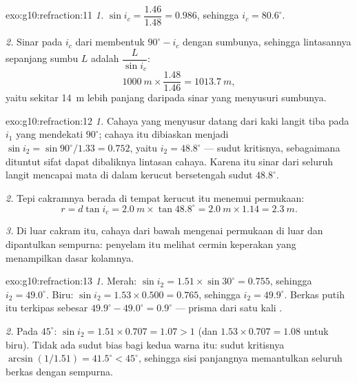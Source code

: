 \begin{solution}{exo:g10:refraction:11}
\emph{1.} $\sin i_c = \dfrac{1.46}{1.48} = 0.986$, sehingga
$i_c = 80.6^\circ$.

\emph{2.} Sinar pada $i_c$ dari  membentuk $90^\circ - i_c$
dengan sumbunya, sehingga lintasannya sepanjang sumbu $L$ adalah
$\dfrac{L}{\sin i_c}$:
\[
\qty{1000}{m} \times \frac{1.48}{1.46} = \qty{1013.7}{m},
\]
yaitu sekitar \qty{14}{m} lebih panjang daripada sinar yang menyusuri
sumbunya.
\end{solution}

\begin{solution}{exo:g10:refraction:12}
\emph{1.} Cahaya yang menyusur datang dari kaki langit tiba pada $i_1$
yang mendekati $90^\circ$; cahaya itu dibiaskan menjadi
$\sin i_2 = \sin 90^\circ / 1.33 = 0.752$, yaitu $i_2 = 48.8^\circ$ ---
sudut kritisnya, sebagaimana dituntut sifat dapat dibaliknya lintasan
cahaya. Karena itu sinar dari seluruh langit mencapai mata di dalam
kerucut bersetengah sudut $48.8^\circ$.

\emph{2.} Tepi cakramnya berada di tempat kerucut itu menemui
permukaan:
\[
r = d \tan i_c = \qty{2.0}{m} \times \tan 48.8^\circ
= \qty{2.0}{m} \times 1.14 = \qty{2.3}{m}.
\]

\emph{3.} Di luar cakram itu, cahaya dari bawah mengenai permukaan di
luar  dan dipantulkan sempurna: penyelam itu melihat cermin
keperakan yang menampilkan dasar kolamnya.
\end{solution}

\begin{solution}{exo:g10:refraction:13}
\emph{1.} Merah: $\sin i_2 = 1.51 \times \sin 30^\circ = 0.755$,
sehingga $i_2 = 49.0^\circ$. Biru: $\sin i_2 = 1.53 \times 0.500 = 0.765$, sehingga $i_2 = 49.9^\circ$. Berkas putih itu terkipas
sebesar $49.9^\circ - 49.0^\circ = 0.9^\circ$ ---  prisma dari
satu kali .

\emph{2.} Pada $45^\circ$: $\sin i_2 = 1.51 \times 0.707 = 1.07 > 1$
(dan $1.53 \times 0.707 = 1.08$ untuk biru). Tidak ada sudut bias bagi
kedua warna itu: sudut kritisnya
$\arcsin(1/1.51) = 41.5^\circ < 45^\circ$, sehingga sisi panjangnya
memantulkan seluruh berkas dengan sempurna.
\end{solution}

